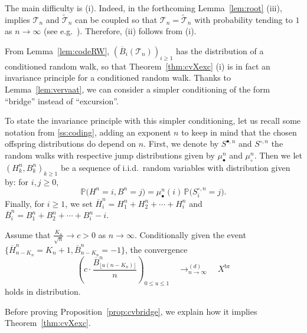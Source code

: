 \documentclass[10pt]{amsart}
\theoremstyle{definition}\newtheorem{defi}[theo]{Definition}\newtheorem{rema}[theo]{Remark}\newtheorem{exam}[theo]{Example}\newtheorem{exem}[theo]{Example}\newtheorem{nota}[theo]{Notation}
\def\mubn{\mu_{\bullet}^{n}}
\def\mucn{\mu_{\circ}^{n}}
\def\Sbn{S^{\bullet,n}}
\def\Scn{S^{\circ,n}}
\def\oB{\overline{B}}
\def \Xbr{X^{\mathrm{br}}}
\def\tTs{\tilde{\Ts}}
\def\Ts{\mathscr{T}}
\newcommand\Prb[1]{\mathbb{P}\big(#1\big)}
\begin{document}
The main difficulty is (i). Indeed, in the forthcoming Lemma~\ref{lem:root} (iii),
implies $\Ts_{n}$ and $\tTs _{n}$ can be coupled so that $\Ts_{n}=\tTs_{n}$
with probability tending to $1$ as $ n \rightarrow \infty$ (see e.g.~\cite{Lin92}).
Therefore, (ii) follows from (i).


From Lemma~\ref{lem:codeRW}, $(\oB_i(\Ts_{n}))_{i \ge 1}$ has the distribution of a conditioned random walk,
so that Theorem~\ref{thm:cvXexc} (i) is in fact an invariance principle for a conditioned random walk.
Thanks to Lemma~\ref{lem:vervaat},
we can consider a simpler conditioning of the form ``bridge'' instead of ``excursion''.

To state the invariance principle with this simpler conditioning, let us
recall some notation from \cref{ss:coding}, adding an exponent $n$ to keep in mind that the
chosen offspring distributions do depend on $n$.
First, we  denote by $\Sbn$ and $\Scn$ the random walks with respective jump distributions given by $\mubn$ and $\mucn$.
Then we let $(H^{n}_{k},B^{n}_{k})_{k \geq 1}$ be a sequence of i.i.d.~random variables with distribution
given by: for $i, j \geq 0$,  \[ \Prb{H^{n}=i,B^{n}=j}=\mubn(i) \, \Prb{\Scn_{i}=j}.\]
Finally, for $i \ge 1$, we set $\overline{H}^{n}_{i}=H^{n}_{1}+H^{n}_{2}+ \cdots+H^{n}_{i}$ and  $\oB^{n}_{i}=B^{n}_{1}+B^{n}_{2}+ \cdots+B^{n}_{i}-i$.




\begin{proposition}
\label{prop:cvbridge}
Assume that $ \tfrac{K_{n}}{\sqrt{n}} \rightarrow c>0$ as $n \rightarrow \infty$. Conditionally given the event
$ \{\overline{H}^{n}_{n-K_{n}}=K_{n}+1, \oB^{n}_{n-K_{n}}=-1 \}$, the convergence
\[  \left(   c \cdot  \frac{\oB^{n}_{\lfloor u (n-K_{n}) \rfloor}}{ n} \right)_{0 \leq u \leq 1}  \quad \mathop{\longrightarrow}^{(d)}_{n \rightarrow \infty} \quad \Xbr\]
holds in distribution.
\end{proposition}


Before proving Proposition~\ref{prop:cvbridge}, we explain how it implies Theorem~\ref{thm:cvXexc}.
\end{document}
